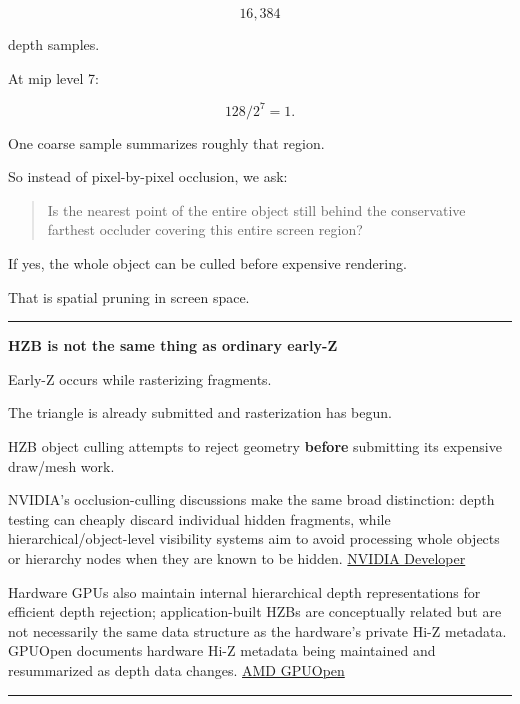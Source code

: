 \[
16,384
\]

depth samples.

At mip level 7:

\[
128/2^7=1.
\]

One coarse sample summarizes roughly that region.

So instead of pixel-by-pixel occlusion, we ask:

\begin{quote}
Is the nearest point of the entire object still behind the conservative farthest occluder covering this entire screen region?
\end{quote}

If yes, the whole object can be culled before expensive rendering.

That is spatial pruning in screen space.

\begin{center}\rule{0.5\linewidth}{0.5pt}\end{center}

\textbf{HZB is not the same thing as ordinary early-Z}

Early-Z occurs while rasterizing fragments.

The triangle is already submitted and rasterization has begun.

HZB object culling attempts to reject geometry \textbf{before} submitting its expensive draw/mesh work.

NVIDIA's occlusion-culling discussions make the same broad distinction: depth testing can cheaply discard individual hidden fragments, while hierarchical/object-level visibility systems aim to avoid processing whole objects or hierarchy nodes when they are known to be hidden. \href{https://developer.nvidia.com/gpugems/gpugems/part-v-performance-and-practicalities/chapter-29-efficient-occlusion-culling?utm_source=chatgpt.com}{NVIDIA Developer}

Hardware GPUs also maintain internal hierarchical depth representations for efficient depth rejection; application-built HZBs are conceptually related but are not necessarily the same data structure as the hardware's private Hi-Z metadata. GPUOpen documents hardware Hi-Z metadata being maintained and resummarized as depth data changes. \href{https://gpuopen.com/manuals/rgp_manual/overview_windows/?utm_source=chatgpt.com}{AMD GPUOpen}

\begin{center}\rule{0.5\linewidth}{0.5pt}\end{center}

